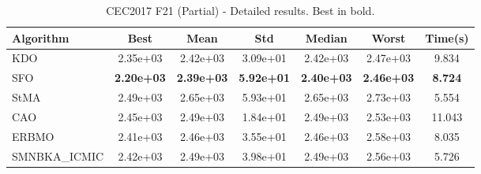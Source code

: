 \begin{table}[H]
\centering\small
\caption{CEC2017 F21 (Partial) - Detailed results. Best in bold.}
\label{tab:cec2017_F21}
\begin{tabular}{lcccccc}
\toprule
\textbf{Algorithm} & \textbf{Best} & \textbf{Mean} & \textbf{Std} & \textbf{Median} & \textbf{Worst} & \textbf{Time(s)} \\
\midrule
KDO & 2.35e+03 & 2.42e+03 & 3.09e+01 & 2.42e+03 & 2.47e+03 & 9.834 \\
SFO & \textbf{2.20e+03} & \textbf{2.39e+03} & \textbf{5.92e+01} & \textbf{2.40e+03} & \textbf{2.46e+03} & \textbf{8.724} \\
StMA & 2.49e+03 & 2.65e+03 & 5.93e+01 & 2.65e+03 & 2.73e+03 & 5.554 \\
CAO & 2.45e+03 & 2.49e+03 & 1.84e+01 & 2.49e+03 & 2.53e+03 & 11.043 \\
ERBMO & 2.41e+03 & 2.46e+03 & 3.55e+01 & 2.46e+03 & 2.58e+03 & 8.035 \\
SMNBKA_ICMIC & 2.42e+03 & 2.49e+03 & 3.98e+01 & 2.49e+03 & 2.56e+03 & 5.726 \\
\bottomrule
\end{tabular}
\end{table}
